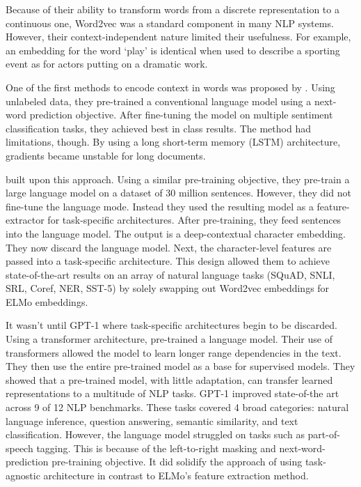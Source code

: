 Because of their ability to transform words from a discrete representation to a continuous one, Word2vec \citep{mikolov2013efficient} was a standard component in many NLP systems. However, their context-independent nature limited their usefulness. For example, an embedding for the word ‘play’ is identical when used to describe a sporting event as for actors putting on a dramatic work.

One of the first methods to encode context in words was proposed by \cite{dai2015semisupervised}. Using unlabeled data, they pre-trained a conventional language model using a next-word prediction objective. After fine-tuning the model on multiple sentiment classification tasks, they achieved best in class results. The method had limitations, though. By using a long short-term memory (LSTM) architecture, gradients became unstable for long documents.

\cite{peters2018deep} built upon this approach. Using a similar pre-training objective, they pre-train a large language model on a dataset of 30 million sentences. However, they did not fine-tune the language mode. Instead they used the resulting model as a feature-extractor for task-specific architectures. After pre-training, they feed sentences into the language model. The output is a deep-contextual character embedding. They now discard the language model. Next, the character-level features are passed into a task-specific architecture. This design allowed them to achieve state-of-the-art results on an array of natural language tasks (SQuAD, SNLI, SRL, Coref, NER, SST-5) by solely swapping out Word2vec embeddings for ELMo embeddings.

It wasn’t until GPT-1 where task-specific architectures begin to be discarded. Using a transformer architecture, \cite{radford2018improving} pre-trained a language model. Their use of transformers allowed the model to learn longer range dependencies in the text. They then use the entire pre-trained model as a base for supervised models. They showed that a pre-trained model, with little adaptation, can transfer learned representations to a multitude of NLP tasks. GPT-1 improved state-of-the art across 9 of 12 NLP benchmarks. These tasks covered 4 broad categories: natural language inference, question answering, semantic similarity, and text classification. However, the language model struggled on tasks such as part-of-speech tagging. This is because of the left-to-right masking and next-word-prediction pre-training objective. It did solidify the approach of using task-agnostic architecture in contrast to ELMo’s feature extraction method.


